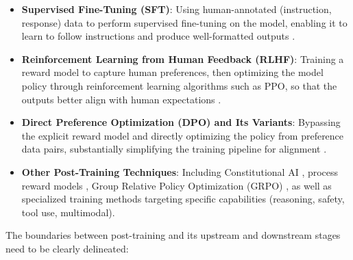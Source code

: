 \begin{itemize}[leftmargin=2em]
  \item \textbf{Supervised Fine-Tuning (SFT)}:
    Using human-annotated (instruction, response) data to perform supervised fine-tuning on the model,
    enabling it to learn to follow instructions and produce well-formatted outputs
    \cite{wei2022flan,ouyang2022instructgpt,sanh2022multitask}.

  \item \textbf{Reinforcement Learning from Human Feedback (RLHF)}:
    Training a reward model to capture human preferences, then optimizing the model policy
    through reinforcement learning algorithms such as PPO,
    so that the outputs better align with human expectations
    \cite{christiano2017rlhf,ouyang2022instructgpt,bai2022constitutional}.

  \item \textbf{Direct Preference Optimization (DPO) and Its Variants}:
    Bypassing the explicit reward model and directly optimizing the policy from preference data pairs,
    substantially simplifying the training pipeline for alignment
    \cite{rafailov2023dpo,azar2023ipo,ethayarajh2024kto}.

  \item \textbf{Other Post-Training Techniques}:
    Including Constitutional AI \cite{bai2022constitutional},
    process reward models \cite{lightman2023prm},
    Group Relative Policy Optimization (GRPO) \cite{shao2024grpo},
    as well as specialized training methods targeting specific capabilities (reasoning, safety, tool use, multimodal).
\end{itemize}

\noindent
The boundaries between post-training and its upstream and downstream stages need to be clearly delineated:


